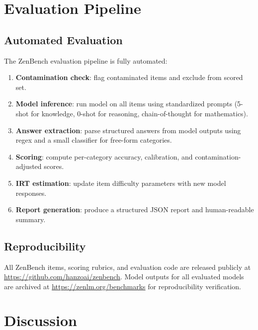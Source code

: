 \documentclass[11pt,a4paper]{article}
\begin{document}
\section{Evaluation Pipeline}
\label{sec:pipeline}

\subsection{Automated Evaluation}

The ZenBench evaluation pipeline is fully automated:

\begin{enumerate}
    \item \textbf{Contamination check}: flag contaminated items and exclude from scored set.
    \item \textbf{Model inference}: run model on all items using standardized prompts
          (5-shot for knowledge, 0-shot for reasoning, chain-of-thought for mathematics).
    \item \textbf{Answer extraction}: parse structured answers from model outputs using
          regex and a small classifier for free-form categories.
    \item \textbf{Scoring}: compute per-category accuracy, calibration, and contamination-adjusted scores.
    \item \textbf{IRT estimation}: update item difficulty parameters with new model responses.
    \item \textbf{Report generation}: produce a structured JSON report and human-readable summary.
\end{enumerate}

\subsection{Reproducibility}

All ZenBench items, scoring rubrics, and evaluation code are released publicly at
\url{https://github.com/hanzoai/zenbench}. Model outputs for all evaluated models are
archived at \url{https://zenlm.org/benchmarks} for reproducibility verification.

\section{Discussion}
\label{sec:discussion}
\end{document}
